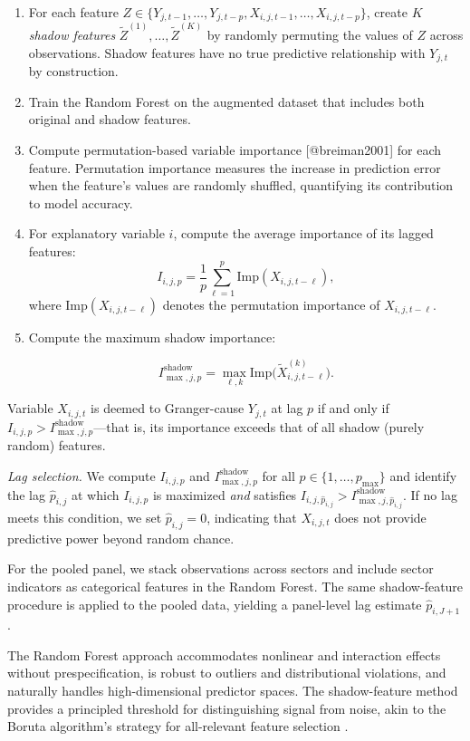 \documentclass[preprint, 3p,
authoryear]{elsarticle} %
\begin{document}
\begin{enumerate}
\item For each feature $Z \in \{Y_{j,t-1},\ldots,Y_{j,t-p}, X_{i,j,t-1},\ldots,X_{i,j,t-p}\}$, create $K$ \textit{shadow features} $\widetilde{Z}^{(1)},\ldots,\widetilde{Z}^{(K)}$ by randomly permuting the values of $Z$ across observations. Shadow features have no true predictive relationship with $Y_{j,t}$ by construction.
\item Train the Random Forest on the augmented dataset that includes both original and shadow features.
\item Compute permutation-based variable importance [@breiman2001] for each feature. Permutation importance measures the increase in prediction error when the feature's values are randomly shuffled, quantifying its contribution to model accuracy.
\item For explanatory variable $i$, compute the average importance of its lagged features:
\begin{equation}
I_{i,j,p} = \frac{1}{p} \sum_{\ell=1}^{p} \text{Imp}(X_{i,j,t-\ell}),
\label{eq:rf_importance}
\end{equation}
where $\text{Imp}(X_{i,j,t-\ell})$ denotes the permutation importance of $X_{i,j,t-\ell}$.
\item Compute the maximum shadow importance:

\begin{equation}
I^{\text{shadow}}_{\max,j,p} = \max_{\ell,k} \text{Imp}\bigl(\widetilde{X}_{i,j,t-\ell}^{(k)}\bigr).
\label{eq:rf_shadow_max}
\end{equation}
\end{enumerate}

\noindent Variable \(X_{i,j,t}\) is deemed to Granger-cause \(Y_{j,t}\)
at lag \(p\) if and only if
\(I_{i,j,p} > I^{\text{shadow}}_{\max,j,p}\)---that is, its importance
exceeds that of all shadow (purely random) features.

\textit{Lag selection.} We compute \(I_{i,j,p}\) and
\(I^{\text{shadow}}_{\max,j,p}\) for all \(p \in \{1,\ldots,p_{\max}\}\)
and identify the lag \(\widehat{p}_{i,j}\) at which \(I_{i,j,p}\) is
maximized \textit{and} satisfies
\(I_{i,j,\widehat{p}_{i,j}} > I^{\text{shadow}}_{\max,j,\widehat{p}_{i,j}}\).
If no lag meets this condition, we set \(\widehat{p}_{i,j} = 0\),
indicating that \(X_{i,j,t}\) does not provide predictive power beyond
random chance.

For the pooled panel, we stack observations across sectors and include
sector indicators as categorical features in the Random Forest. The same
shadow-feature procedure is applied to the pooled data, yielding a
panel-level lag estimate \(\widehat{p}_{i,J+1}\).

The Random Forest approach accommodates nonlinear and interaction
effects without prespecification, is robust to outliers and
distributional violations, and naturally handles high-dimensional
predictor spaces. The shadow-feature method provides a principled
threshold for distinguishing signal from noise, akin to the Boruta
algorithm's strategy for all-relevant feature selection
\citep{kursa2010}.

\printglossaries

\color{white}


\end{document}
